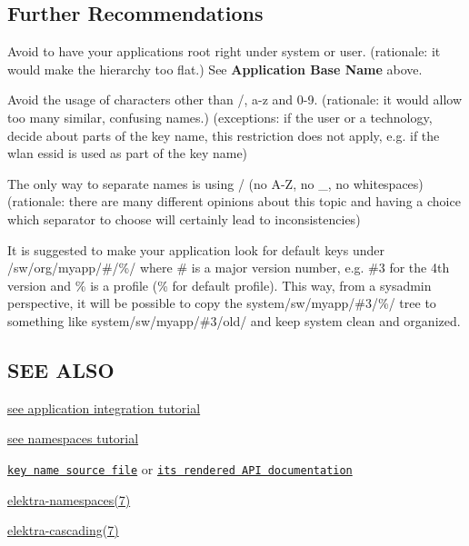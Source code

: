 \subsection*{Further Recommendations}


\begin{DoxyItemize}
\item Avoid to have your applications root right under {\ttfamily system} or {\ttfamily user}. (rationale\+: it would make the hierarchy too flat.) See {\bfseries Application Base Name} above.
\item Avoid the usage of characters other than {\ttfamily /}, a-\/z and 0-\/9. (rationale\+: it would allow too many similar, confusing names.) (exceptions\+: if the user or a technology, decide about parts of the key name, this restriction does not apply, e.\+g. if the wlan essid is used as part of the key name)
\item The only way to separate names is using {\ttfamily /} (no A-\/Z, no {\ttfamily \+\_\+}, no whitespaces) (rationale\+: there are many different opinions about this topic and having a choice which separator to choose will certainly lead to inconsistencies)
\item It is suggested to make your application look for default keys under {\ttfamily /sw/org/myapp/\#/\%/} where {\ttfamily \#} is a major version number, e.\+g. {\ttfamily \#3} for the 4th version and {\ttfamily \%} is a profile ({\ttfamily \%} for default profile). This way, from a sysadmin perspective, it will be possible to copy the {\ttfamily system/sw/myapp/\#3/\%/} tree to something like {\ttfamily system/sw/myapp/\#3/old/} and keep system clean and organized.
\end{DoxyItemize}

\subsection*{S\+EE A\+L\+SO}


\begin{DoxyItemize}
\item \hyperlink{doc_tutorials_application-integration_md}{see application integration tutorial}
\item \hyperlink{doc_tutorials_namespaces_md}{see namespaces tutorial}
\item \href{/home/markus/Projekte/Elektra/current/src/libs/elektra/keyname.c}{\tt key name source file} or \href{https://doc.libelektra.org/api/latest/html/group__keyname.html#details}{\tt its rendered A\+PI documentation}
\item \hyperlink{md_doc_help_elektra-namespaces_doc_help_elektra-namespaces_md}{elektra-\/namespaces(7)}
\item \hyperlink{md_doc_help_elektra-cascading_doc_help_elektra-cascading_md}{elektra-\/cascading(7)} 
\end{DoxyItemize}